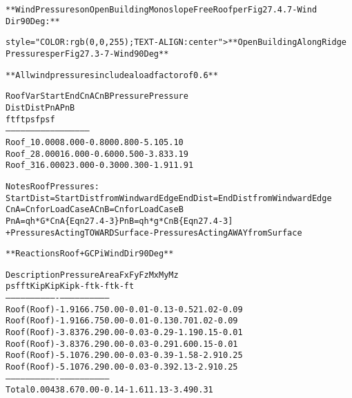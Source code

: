 \documentclass[12pt,notitle,letterpaper]{report}
\renewenvironment{quote}
  {\small\list{}{\rightmargin=0cm \leftmargin=0cm}%
   \item\relax}
  {\endlist}
\begin{document}
\begin{quote}
\begin{alltt}
**Wind Pressures on Open Building Monoslope Free Roof per Fig 27.4.7 - Wind
Dir 90 Deg:**


style="COLOR: rgb(0,0,255); TEXT-ALIGN: center"> **Open Building Along Ridge
Pressures per Fig 27.3-7 - Wind 90 Deg**

**All wind pressures include a load factor of 0.6**



         Roof Var     Start       End        CnA         CnB       Pressure      Pressure
                       Dist       Dist                               PnA           PnB
                        ft         ft                                psf           psf
         --------     ------     ------     ------      -----      --------      --------
         Roof_1        0.000      8.000     -0.800      0.800         -5.10          5.10
         Roof_2        8.000     16.000     -0.600      0.500         -3.83          3.19
         Roof_3       16.000     23.000     -0.300      0.300         -1.91          1.91



         Notes Roof Pressures:
         Start Dist = Start Dist from Windward Edge  End Dist = End Dist from Windward Edge
         CnA        = Cn for Load Case A             CnB      = Cn for Load Case B
         PnA        = qh*G*CnA \{Eqn 27.4-3\}          PnB      = qh*g*CnB  \{Eqn 27.4-3]
         + Pressures Acting TOWARD Surface          - Pressures Acting AWAY from Surface




**Reactions Roof +GCPi Wind Dir 90 Deg**



         Description   Pressure    Area     Fx     Fy      Fz      Mx       My       Mz
                         psf        ft     Kip     Kip     Kip    k-ft     k-ft     k-ft
         -----------   --------   ------   ----   -----   -----   -----    -----    -----
         Roof (Roof)      -1.91    66.75   0.00   -0.01   -0.13   -0.52     1.02    -0.09
         Roof (Roof)      -1.91    66.75   0.00   -0.01   -0.13    0.70     1.02    -0.09
         Roof (Roof)      -3.83    76.29   0.00   -0.03   -0.29   -1.19     0.15    -0.01
         Roof (Roof)      -3.83    76.29   0.00   -0.03   -0.29    1.60     0.15    -0.01
         Roof (Roof)      -5.10    76.29   0.00   -0.03   -0.39   -1.58    -2.91     0.25
         Roof (Roof)      -5.10    76.29   0.00   -0.03   -0.39    2.13    -2.91     0.25
         -----------   --------   ------   ----   -----   -----   -----    -----    -----
         Total             0.00   438.67   0.00   -0.14   -1.61    1.13    -3.49     0.31




\end{alltt}
\end{quote}
\end{document}
